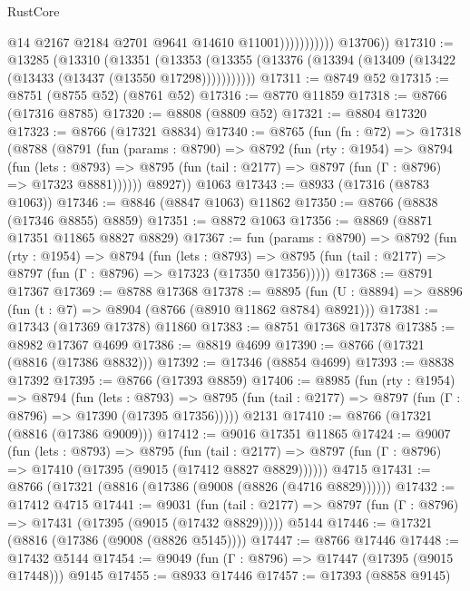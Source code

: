\begin{lexlean}{RustCore}
\begin{coremodule}
                              @14
                              @2167
                              @2184
                              @2701
                              @9641
                              @14610
                              @11001)))))))))))
        @13706))
@17310 := @13285
    (@13310
      (@13351
        (@13353 (@13355 (@13376 (@13394 (@13409 (@13422 (@13433 (@13437 (@13550 @17298)))))))))))
@17311 := @8749 @52
@17315 := @8751 (@8755 @52) (@8761 @52)
@17316 := @8770 @11859
@17318 := @8766 (@17316 @8785)
@17320 := @8808 (@8809 @52)
@17321 := @8804 @17320
@17323 := @8766 (@17321 @8834)
@17340 := @8765
    (fun (fn : @72) =>
    @17318
      (@8788
        (@8791
          (fun (params : @8790) =>
          @8792
            (fun (rty : @1954) =>
            @8794
              (fun (lets : @8793) =>
              @8795 (fun (tail : @2177) => @8797 (fun (Γ : @8796) => @17323 @8881))))))
        @8927))
    @1063
@17343 := @8933 (@17316 (@8783 @1063))
@17346 := @8846 (@8847 @1063) @11862
@17350 := @8766 (@8838 (@17346 @8855) @8859)
@17351 := @8872 @1063
@17356 := @8869 (@8871 @17351 @11865 @8827 @8829)
@17367 := fun (params : @8790) =>
  @8792
    (fun (rty : @1954) =>
    @8794
      (fun (lets : @8793) =>
      @8795 (fun (tail : @2177) => @8797 (fun (Γ : @8796) => @17323 (@17350 @17356)))))
@17368 := @8791 @17367
@17369 := @8788 @17368
@17378 := @8895
    (fun (U : @8894) => @8896 (fun (t : @7) => @8904 (@8766 (@8910 @11862 @8784) @8921)))
@17381 := @17343 (@17369 @17378) @11860
@17383 := @8751 @17368 @17378
@17385 := @8982 @17367 @4699
@17386 := @8819 @4699
@17390 := @8766 (@17321 (@8816 (@17386 @8832)))
@17392 := @17346 (@8854 @4699)
@17393 := @8838 @17392
@17395 := @8766 (@17393 @8859)
@17406 := @8985
    (fun (rty : @1954) =>
    @8794
      (fun (lets : @8793) =>
      @8795 (fun (tail : @2177) => @8797 (fun (Γ : @8796) => @17390 (@17395 @17356)))))
    @2131
@17410 := @8766 (@17321 (@8816 (@17386 @9009)))
@17412 := @9016 @17351 @11865
@17424 := @9007
    (fun (lets : @8793) =>
    @8795
      (fun (tail : @2177) =>
      @8797 (fun (Γ : @8796) => @17410 (@17395 (@9015 (@17412 @8827 @8829))))))
    @4715
@17431 := @8766 (@17321 (@8816 (@17386 (@9008 (@8826 (@4716 @8829))))))
@17432 := @17412 @4715
@17441 := @9031
    (fun (tail : @2177) => @8797 (fun (Γ : @8796) => @17431 (@17395 (@9015 (@17432 @8829)))))
    @5144
@17446 := @17321 (@8816 (@17386 (@9008 (@8826 @5145))))
@17447 := @8766 @17446
@17448 := @17432 @5144
@17454 := @9049 (fun (Γ : @8796) => @17447 (@17395 (@9015 @17448))) @9145
@17455 := @8933 @17446
@17457 := @17393 (@8858 @9145)

\end{coremodule}
\end{lexlean}
